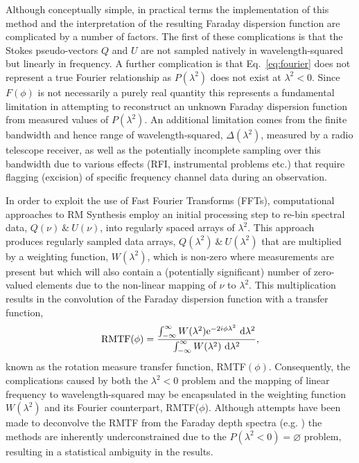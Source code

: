 \documentclass[fleqn,usenatbib]{mnras}
\begin{document}
Although conceptually simple, in practical terms the implementation of this method and the interpretation of the resulting Faraday dispersion function are complicated by a number of factors. The first of these complications is that the Stokes pseudo-vectors $Q$ and $U$ are not sampled natively in wavelength-squared but linearly in frequency. A further complication is that Eq.~\ref{eq:fourier} does not represent a true Fourier relationship as $P(\lambda^2)$ does not exist at $\lambda^2 < 0$. Since $F(\phi)$ is not necessarily a purely real quantity this represents a fundamental limitation in attempting to reconstruct an unknown Faraday dispersion function from measured values of $P(\lambda^2)$. An additional limitation comes from the finite bandwidth and hence range of wavelength-squared, $\Delta (\lambda^2)$, measured by a radio telescope receiver, as well as the potentially incomplete sampling over this bandwidth due to various effects (RFI, instrumental problems etc.) that require flagging (excision) of specific frequency channel data during an observation.

In order to exploit the use of Fast Fourier Transforms (FFTs), computational approaches to RM Synthesis employ an initial processing step to re-bin spectral data, $Q(\nu)~\&~U(\nu)$, into regularly spaced arrays of $\lambda^2$. This approach produces regularly sampled data arrays, $Q(\lambda^2)~\&~U(\lambda^2)$ that are multiplied by a weighting function, $W(\lambda^2)$, which is non-zero where measurements are present but which will also contain a (potentially significant) number of zero-valued elements due to the non-linear mapping of $\nu$ to $\lambda^2$. This  multiplication results in the convolution of the Faraday dispersion function with a transfer function,
%
\begin{equation}
\label{eq:rmtf}
{\rm RMTF}(\phi) = \frac{\int_{-\infty}^{\infty} { W(\lambda^2){\rm e}^{-2i\phi\lambda^2}~{\rm d}\lambda^2 }}{\int_{-\infty}^{\infty} { W(\lambda^2)~{\rm d}\lambda^2 }},
\end{equation}
%
known as the rotation measure transfer function, RMTF$(\phi)$. Consequently, the complications caused by both the $\lambda^2 < 0$ problem and the mapping of linear frequency to wavelength-squared may be encapsulated in the weighting function $W(\lambda^2)$ and its Fourier counterpart, RMTF($\phi$). Although attempts have been made to deconvolve the RMTF from the Faraday depth spectra (e.g. \cite{2009IAUS..259..591H}) the  methods are inherently underconstrained due to the $P(\lambda^2<0) = \varnothing$ problem, resulting in a statistical ambiguity in the results.
\end{document}
